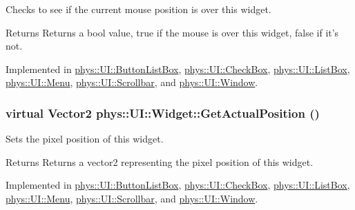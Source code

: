Checks to see if the current mouse position is over this widget. 

\begin{DoxyReturn}{Returns}
Returns a bool value, true if the mouse is over this widget, false if it's not. 
\end{DoxyReturn}


Implemented in \hyperlink{classphys_1_1UI_1_1ButtonListBox_aaa8b11b174a0475cadee3d3349ef1a58}{phys::UI::ButtonListBox}, \hyperlink{classphys_1_1UI_1_1CheckBox_a3c9b10c692dfb62dedbd091dac12c115}{phys::UI::CheckBox}, \hyperlink{classphys_1_1UI_1_1ListBox_a789faeb98d98bb4d4d89cae8c53d4bc0}{phys::UI::ListBox}, \hyperlink{classphys_1_1UI_1_1Menu_af2514d2614322856f604be2e167d0872}{phys::UI::Menu}, \hyperlink{classphys_1_1UI_1_1Scrollbar_a8afdd63e36a7fdc15bd8660d9800f2c5}{phys::UI::Scrollbar}, and \hyperlink{classphys_1_1UI_1_1Window_a771bc9e43c0492ab179d8126c30665cf}{phys::UI::Window}.

\hypertarget{classphys_1_1UI_1_1Widget_a0a29fecff7f56d7909f65fd63b0990e7}{
\subsubsection[{GetActualPosition}]{\setlength{\rightskip}{0pt plus 5cm}virtual {\bf Vector2} phys::UI::Widget::GetActualPosition ()}}
\label{d9/d48/classphys_1_1UI_1_1Widget_a0a29fecff7f56d7909f65fd63b0990e7}


Sets the pixel position of this widget. 

\begin{DoxyReturn}{Returns}
Returns a vector2 representing the pixel position of this widget. 
\end{DoxyReturn}


Implemented in \hyperlink{classphys_1_1UI_1_1ButtonListBox_addc5d7c6ab2a48ffa0d4b2e46c20d9a5}{phys::UI::ButtonListBox}, \hyperlink{classphys_1_1UI_1_1CheckBox_a33bedaa00456be8ca0e9b2eafcd5b21a}{phys::UI::CheckBox}, \hyperlink{classphys_1_1UI_1_1ListBox_a44046453283fb2c54e10dc868705352a}{phys::UI::ListBox}, \hyperlink{classphys_1_1UI_1_1Menu_a74a1b8e9b1c5d36c12e5a0a7f813c40a}{phys::UI::Menu}, \hyperlink{classphys_1_1UI_1_1Scrollbar_a73337985c0f1f173e253c88705ae5d6e}{phys::UI::Scrollbar}, and \hyperlink{classphys_1_1UI_1_1Window_a811fb495bc698752e03778b18f2b1a30}{phys::UI::Window}.

